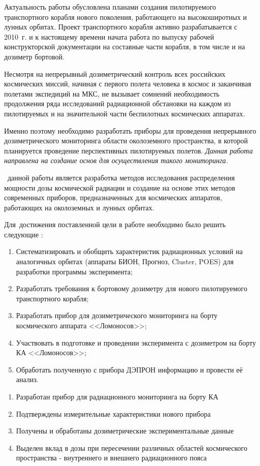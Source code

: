 {\actuality}
 Актуальность работы обусловлена планами создания пилотируемого транспортного корабля нового поколения, работающего на высокоширотных и лунных орбитах. Проект транспортного корабля активно разрабатывается с 2010~г. и к настоящему времени начата работа по выпуску рабочей конструкторской документации на составные части корабля, в том числе и на дозиметр бортовой.
 
 Несмотря на непрерывный дозиметрический контроль всех российских космических миссий, начиная с первого полета человека в космос и заканчивая полетами экспедиций на МКС, не вызывает сомнений необходимость продолжения ряда исследований радиационной обстановки на каждом из пилотируемых и на значительной части беспилотных космических аппаратах.  
 
 Именно поэтому необходимо разработать приборы  для проведения непрерывного дозиметрического мониторинга области околоземного пространства, в которой планируется проведение перспективных пилотируемых полетов. \textit{Данная работа направлена на создание основ для осуществления такого мониторинга.}

 \aim\ данной работы является разработка методов исследования распределения мощности дозы космической радиации и создание на основе этих методов современных приборов, предназначенных для космических аппаратов, работающих на околоземных и лунных орбитах.
  

Для~достижения поставленной цели в работе необходимо было решить следующие  {\tasks}:
\begin{enumerate}
  \item Систематизировать и обобщить характеристик радиационных условий на аналогичных орбитах (аппараты БИОН, Прогноз, Cluster, POES) для разработки программы эксперимента;
  \item Разработать требования к бортовому дозиметру для нового пилотируемого транспортного корабля;
  \item Разработать прибор для дозиметрического мониторинга на борту космического аппарата <<Ломоносов>>;
  \item Участвовать в подготовке и проведении эксперимента с дозиметром на борту КА <<Ломоносов>>;
  \item Обработать полученную с прибора ДЭПРОН информацию и провести её анализ.
  
\end{enumerate}

\begin{enumerate}
  \item Разработан прибор для радиационного мониторинга на борту КА
  \item Подтверждены измерительные характеристики нового прибора
  \item Получены и обработаны дозиметрические экспериментальные данные
  \item Выделен вклад в дозы при пересечении различных областей космического пространства - внутреннего и внешнего радиационного пояса
\end{enumerate}

